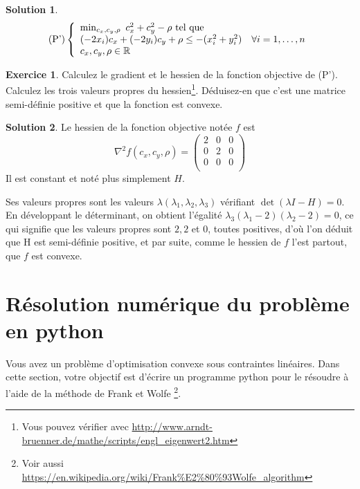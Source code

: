 \documentclass[a4paper,francais]{article}
\newcommand{\R}{{\ensuremath\mathbb{R}}}
\theoremstyle{definition}
\newtheorem{exercice}{Exercice}[section]
\newtheorem*{solution}{Solution}
\begin{document}
\begin{solution}
\[
\text{(P')}
\left\{
\begin{array}{ll}
  \min_{c_x, c_y, \rho} \ c_x^2 + c_y^2 - \rho \ \text{tel que} & \\
  (-2x_i) c_x + (-2y_i) c_y + \rho  \leq -(x_i^2 + y_i^2) & \forall i = 1, \dots, n \\ 
  c_x, c_y, \rho \in \R \\
\end{array}
\right.
\]
\end{solution}

\begin{exercice}
  Calculez le gradient et le hessien de la fonction objective de (P').
  Calculez les trois valeurs propres du hessien\footnote{Vous pouvez
    vérifier avec \url{http://www.arndt-bruenner.de/mathe/scripts/engl_eigenwert2.htm}}.
  Déduisez-en que c'est une matrice semi-définie positive et que la fonction est convexe. 
\end{exercice}

\begin{solution}
  Le hessien de la fonction objective notée $f$ est
  \[
    {\nabla^2f}(c_x,c_y,\rho) =
    \begin{pmatrix}
      2 & 0 & 0 \\
      0 & 2 & 0 \\
      0 & 0 & 0 \\
    \end{pmatrix}
  \]
  Il est constant et noté plus simplement $H$.
  
  Ses valeurs propres sont les valeurs $\lambda(\lambda_1, \lambda_2, \lambda_3)$
  vérifiant $\det{(\lambda I - H)} = 0$. En développant le déterminant, on obtient
  l'égalité $\lambda_3(\lambda_1 - 2)(\lambda_2 - 2) = 0$, ce qui signifie que les
  valeurs propres sont $2, 2$ et $0$, toutes positives, d'où l'on déduit que
  H est semi-définie positive, et par suite, comme le hessien de $f$ l'est partout,
  que $f$ est convexe. 
\end{solution}

\section{Résolution numérique du problème en python}

Vous avez un problème d'optimisation convexe sous contraintes linéaires. Dans cette
section, votre objectif est d'écrire un programme python pour le résoudre à l'aide
de la méthode de Frank et Wolfe
\footnote{Voir aussi \url{https://en.wikipedia.org/wiki/Frank\%E2\%80\%93Wolfe_algorithm}}. 
\end{document}
